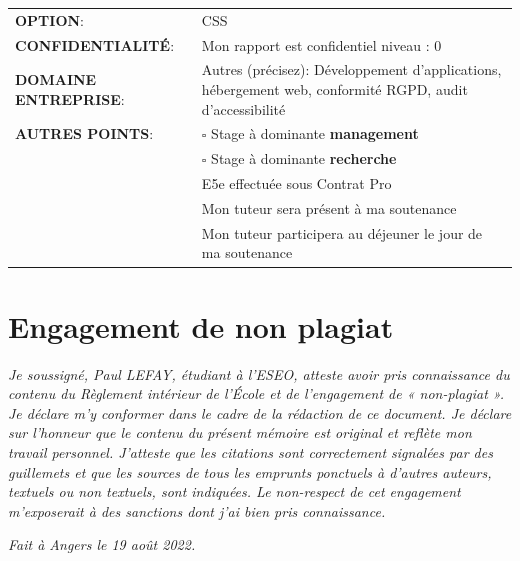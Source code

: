 \documentclass[12pt, a4paper, twoside]{article}
\begin{document}
\begin{center}
	\begin{tabular}{ m{5cm} m{11.5cm} }
	\textbf{OPTION}: &  \mbox{\ooalign{$\checkmark$\cr\hidewidth$\square$\hidewidth\cr}} CSS  \\
    \textbf{CONFIDENTIALITÉ}:  & Mon rapport est confidentiel niveau : \mbox{\ooalign{$\checkmark$\cr\hidewidth$\square$\hidewidth\cr}} 0 \\
    \textbf{DOMAINE ENTREPRISE}: & \mbox{\ooalign{$\checkmark$\cr\hidewidth$\square$\hidewidth\cr}} Autres (précisez): Développement d'applications, hébergement web, conformité RGPD, audit d'accessibilité \\
    \textbf{AUTRES POINTS}: &  $\square$ Stage à dominante \textbf{management} \\
                             &  $\square$ Stage à dominante \textbf{recherche} \\
                             & \mbox{\ooalign{$\checkmark$\cr\hidewidth$\square$\hidewidth\cr}} E5e effectuée sous Contrat Pro \\
                             &  \mbox{\ooalign{$\checkmark$\cr\hidewidth$\square$\hidewidth\cr}} Mon tuteur sera présent à ma soutenance \\
                             &  \mbox{\ooalign{$\checkmark$\cr\hidewidth$\square$\hidewidth\cr}} Mon tuteur participera au déjeuner le jour de ma soutenance \\
\end{tabular}
\end{center}

\newpage

\section*{Engagement de non plagiat}
\textit{Je soussigné, Paul LEFAY, étudiant à l'\gls{ESEO}, atteste avoir pris connaissance du contenu du Règlement intérieur de l'École et de l'engagement de « non-plagiat ». 
Je déclare m'y conformer dans le cadre de la rédaction de ce document. 
Je déclare sur l'honneur que le contenu du présent mémoire est original et reflète mon travail personnel. 
J'atteste que les citations sont correctement signalées par des guillemets et que les sources de tous les emprunts ponctuels à d'autres auteurs, textuels ou non textuels, sont indiquées. 
Le non-respect de cet engagement m'exposerait à des sanctions dont j'ai bien pris connaissance.}

\textit{Fait à Angers le 19 août 2022.}
\end{document}
